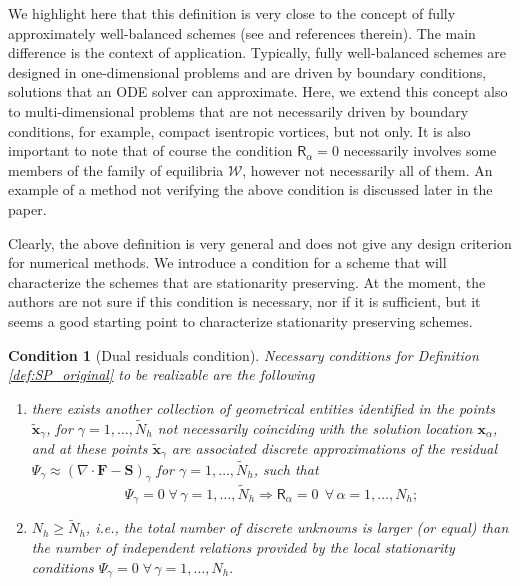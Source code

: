 \documentclass[a4paper,10pt]{article}
\newtheorem{condition}[theorem]{Condition}
\begin{document}
We highlight here that this definition is very close to the concept of fully approximately well-balanced schemes  (see \cite{Kazolea2025,mantri2024fully} and references therein). 
The main difference is the context of application. Typically, fully well-balanced schemes are designed in one-dimensional problems and are driven by boundary conditions, solutions that an ODE solver can approximate.
Here, we extend this concept also to multi-dimensional problems that are not necessarily driven by boundary conditions, for example, compact isentropic vortices, but not only.
It is also important  to note that of course the condition $\mathsf{R}_\alpha=0$ necessarily  involves some members of the  family of equilibria $\mathcal{W}$, however not necessarily
all of them. An example of a method not verifying the above condition is discussed later in the paper.

Clearly, the above   definition is very general and does not give any design criterion for numerical methods. 
We introduce a condition for a scheme that will characterize the schemes that are stationarity preserving. At the moment, the authors are not sure if this condition is necessary, nor if it is sufficient, but it seems a good starting point to characterize stationarity preserving schemes.  
 
\begin{condition}[Dual residuals  condition]\label{cond:SP} 
Necessary conditions  for Definition \ref{def:SP_original} to be realizable are the following 
\begin{enumerate}[label={C.\arabic*}]
\item \label{item:dual_residual_primal_residual} there exists another collection of geometrical entities identified in the points $\tilde {\mathbf{x}}_\gamma$, for $\gamma =1,\dots, \tilde{N}_h$ not necessarily coinciding
with the solution location $\mathbf{x}_\alpha$, and at these points $\tilde {\mathbf{x}}_\gamma$ are associated discrete approximations of the residual $\Psi_\gamma \approx (\nabla\cdot  \mathbf{F}  - \mathbf{S})_{\gamma}$ for $\gamma =1,\dots, \tilde{N}_h$, such that \begin{equation}\label{eq:cond_implication}
\Psi_\gamma=0  \;\forall\,\gamma =1,\dots, \tilde{N}_h \Rightarrow  \mathsf{R}_\alpha =0 \,\;\forall\, \alpha = 1, \dots, N_h;
\end{equation}
\item \label{item:SP_number_of_unknowns} $N_h \geq  \tilde{N}_h$, i.e., the total number of discrete unknowns is larger (or equal) than the number of   independent  relations  provided by the  local stationarity conditions $\Psi_\gamma=0 \;\forall\,\gamma =1,\dots, N_h.$
\end{enumerate}
 \end{condition}
\end{document}
